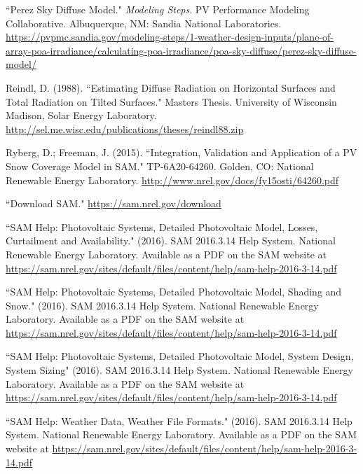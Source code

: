 \documentclass[12pt,letterpaper]{article}
\begin{document}
\begin{thebibliography}{99}
 ``Perez Sky Diffuse Model."  \textit{Modeling Steps}. PV Performance Modeling Collaborative. Albuquerque, NM: Sandia National Laboratories.  \url{https://pvpmc.sandia.gov/modeling-steps/1-weather-design-inputs/plane-of-array-poa-irradiance/calculating-poa-irradiance/poa-sky-diffuse/perez-sky-diffuse-model/}

 Reindl, D. (1988). ``Estimating Diffuse Radiation on Horizontal Surfaces and Total Radiation on Tilted Surfaces." Masters Thesis. University of Wisconsin Madison, Solar Energy Laboratory. \url{http://sel.me.wisc.edu/publications/theses/reindl88.zip}

 Ryberg, D.; Freeman, J. (2015). ``Integration, Validation and Application of a PV Snow Coverage Model in SAM." TP-6A20-64260. Golden, CO: National Renewable Energy Laboratory. \url{http://www.nrel.gov/docs/fy15osti/64260.pdf}

 ``Download SAM." \url{https://sam.nrel.gov/download} 

 ``SAM Help: Photovoltaic Systems, Detailed Photovoltaic Model, Losses, Curtailment and Availability." (2016). SAM 2016.3.14 Help System. National Renewable Energy Laboratory. Available as a PDF on the SAM website at \url{https://sam.nrel.gov/sites/default/files/content/help/sam-help-2016-3-14.pdf}

 ``SAM Help: Photovoltaic Systems, Detailed Photovoltaic Model, Shading and Snow." (2016). SAM 2016.3.14 Help System. National Renewable Energy Laboratory. Available as a PDF on the SAM website at \url{https://sam.nrel.gov/sites/default/files/content/help/sam-help-2016-3-14.pdf}

 ``SAM Help: Photovoltaic Systems, Detailed Photovoltaic Model, System Design, System Sizing" (2016). SAM 2016.3.14 Help System. National Renewable Energy Laboratory. Available as a PDF on the SAM website at \url{https://sam.nrel.gov/sites/default/files/content/help/sam-help-2016-3-14.pdf}

 ``SAM Help: Weather Data, Weather File Formats." (2016). SAM 2016.3.14 Help System. National Renewable Energy Laboratory. Available as a PDF on the SAM website at \url{https://sam.nrel.gov/sites/default/files/content/help/sam-help-2016-3-14.pdf}


\end{thebibliography}
\end{document}
